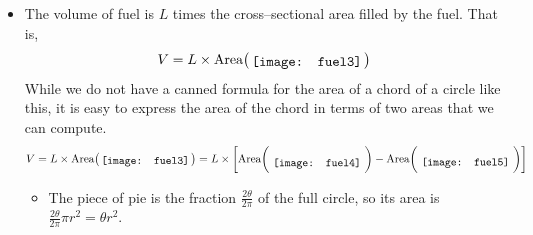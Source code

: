 \begin{eg}
\begin{itemize}
\item The volume of fuel is $L$ times the cross--sectional area filled by
the fuel. That is,
\begin{align*}
  V=L\times\textrm{Area} \big(\smash{\raisebox{-0.2\height}{
                                      \!\texttt{[image: fuel3]}\!
                                                        }}\big)
\end{align*}
While we do not have a canned formula for the area of a chord of a circle
like this, it is easy to express the area of the chord in terms of two areas that we can
compute.
\begin{align*}
  V=L\times\textrm{Area} \big(\smash{\raisebox{-0.2\height}{
                                      \!\texttt{[image: fuel3]}\!
                                                        }}\big)
  =L\times\bigg[\textrm{Area} \bigg(\raisebox{-0.5\height}{
                                    \texttt{[image: fuel4]}
                                                        }\bigg)
    -\textrm{Area}  \bigg(\raisebox{-0.4\height}{
                                    \texttt{[image: fuel5]}
                                                        }\bigg)\bigg]
\end{align*}
\begin{itemize}
 \item The piece of pie  is the fraction $\tfrac{2\theta}{2\pi}$ of the full
circle, so its area is $\tfrac{2\theta}{2\pi}\pi r^2=\theta r^2$.


\end{itemize}
\end{itemize}
\end{eg}
